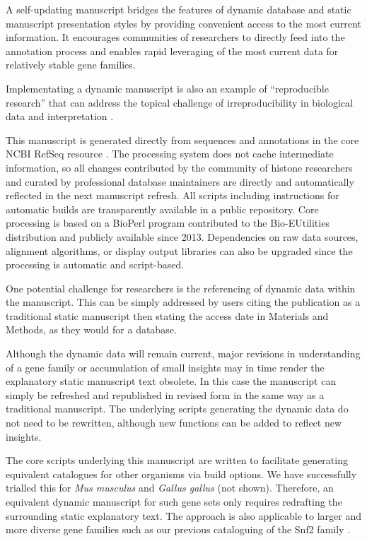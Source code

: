   A self-updating manuscript bridges the features of dynamic database and static manuscript
  presentation styles by providing convenient access to the most current information.
  It encourages communities of researchers to directly feed into the annotation process
  and enables rapid leveraging of the most current data for relatively stable gene families.

  Implementating a dynamic manuscript is also an example of ``reproducible research''
  \citep{reproducible-research-bioinformatics,reproducible-research-law}
  that can address the topical challenge of irreproducibility in biological data
  and interpretation \citep{ErrorProne2012,OpenPrograms2012}.

  This manuscript is generated directly from sequences and annotations
  in the core NCBI RefSeq resource \citep{OLearyRefseq2016}.
  The processing system does not cache intermediate information,
  so all changes contributed by the community of histone researchers
  and curated by professional database maintainers
  are directly and automatically reflected in the next manuscript refresh.
  All scripts including instructions for automatic builds
  are transparently available in a public repository.
  Core processing is based on a BioPerl program contributed to the Bio-EUtilities distribution
  and publicly available since 2013.
  Dependencies on raw data sources, alignment algorithms, or display output libraries
  can also be upgraded since the processing is automatic and script-based.

  One potential challenge for researchers is the referencing of dynamic data within the manuscript.
  This can be simply addressed by users citing the publication as a traditional static manuscript
  then stating the access date in Materials and Methods, as they would for a database.

  Although the dynamic data will remain current,
  major revisions in understanding of a gene family or accumulation of small insights
  may in time render the explanatory static manuscript text obsolete.
  In this case the manuscript can simply be refreshed and republished in revised form
  in the same way as a traditional manuscript.
  The underlying scripts generating the dynamic data do not need to be rewritten,
  although new functions can be added to reflect new insights.

  The core scripts underlying this manuscript are written to facilitate generating
  equivalent catalogues for other organisms via build options.
  We have successfully trialled this for \textit{Mus musculus} and \textit{Gallus gallus} (not shown).
  Therefore, an equivalent dynamic manuscript for such gene sets
  only requires redrafting the surrounding static explanatory text.
  The approach is also applicable to larger and more diverse gene families such as
  our previous cataloguing of the Snf2 family \citep{andrew-snf2-catalogue}.
